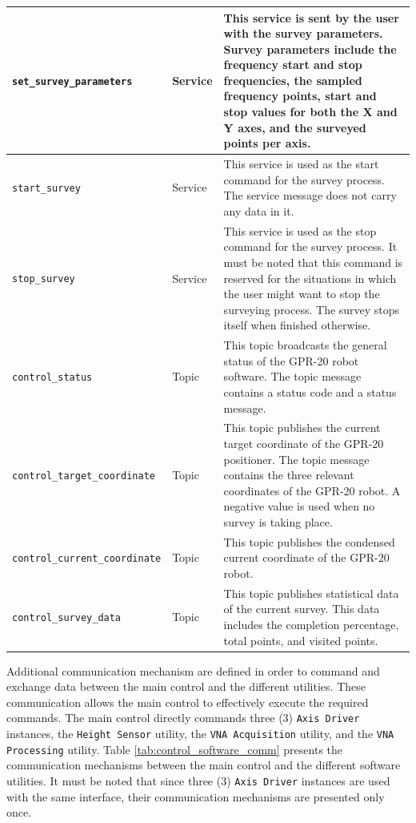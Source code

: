 \documentclass{article}
\begin{document}
\begin{singlespace}
\begin{xltabular}{\textwidth}{|p{5cm}|l|X|}
        \texttt{set\_survey\_parameters} & Service & This service is sent by the user with the survey parameters. Survey parameters include the frequency start and stop frequencies, the sampled frequency points, start and stop values for both the X and Y axes, and the surveyed points per axis. \\ \hline
        \texttt{start\_survey} & Service & This service is used as the start command for the survey process. The service message does not carry any data in it. \\ \hline
        \texttt{stop\_survey} & Service & This service is used as the stop command for the survey process. It must be noted that this command is reserved for the situations in which the user might want to stop the surveying process. The survey stops itself when finished otherwise. \\ \hline
        \texttt{control\_status} & Topic & This topic broadcasts the general status of the GPR-20 robot software. The topic message contains a status code and a status message. \\ \hline
        \texttt{control\_target\_coordinate} & Topic & This topic publishes the current target coordinate of the GPR-20 positioner. The topic message contains the three relevant coordinates of the GPR-20 robot. A negative value is used when no survey is taking place. \\ \hline
        \texttt{control\_current\_coordinate} & Topic & This topic publishes the condensed current coordinate of the GPR-20 robot. \\ \hline
        \texttt{control\_survey\_data} & Topic & This topic publishes statistical data of the current survey. This data includes the completion percentage, total points, and visited points. \\ \hline
    \end{xltabular}
\end{singlespace}

Additional communication mechanism are defined in order to command and exchange data between the main control and the different utilities. These communication allows the main control to effectively execute the required commands. The main control directly commands three (3) \texttt{Axis Driver} instances, the \texttt{Height Sensor} utility, the \texttt{VNA Acquisition} utility, and the \texttt{VNA Processing} utility. Table \ref{tab:control_software_comm} presents the communication mechanisms between the main control and the different software utilities. It must be noted that since three (3) \texttt{Axis Driver} instances are used with the same interface, their communication mechanisms are presented only once.
\end{document}
